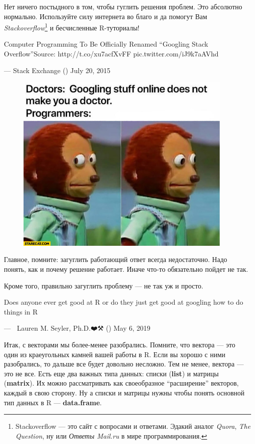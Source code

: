\documentclass[]{book}
\begin{document}
Нет ничего постыдного в том, чтобы гуглить решения проблем. Это
абсолютно нормально. Используйте силу интернета во благо и да помогут
Вам \emph{Stackoverflow}\footnote{Stackoverflow --- это сайт с вопросами
  и ответами. Эдакий аналог \emph{Quora}, \emph{The Question}, ну или
  \emph{Ответы Mail.ru} в мире программирования.} и бесчисленные
R-туториалы!

Computer Programming To Be Officially Renamed ``Googling Stack
Overflow''Source: http://t.co/xu7acfXvFF pic.twitter.com/iJ9k7aAVhd

--- Stack Exchange (\citet{StackExchange}) July 20, 2015

\begin{figure}
\centering
\includegraphics[width=4.16667in]{images/doctors-googling-stuff-online-does-not-make-you-a-doctor-programmers-confused.jpg}
\caption{}
\end{figure}

Главное, помните: загуглить работающий ответ всегда недостаточно. Надо
понять, как и почему решение работает. Иначе что-то обязательно пойдет
не так.

Кроме того, правильно загуглить проблему --- не так уж и просто.

Does anyone ever get good at R or do they just get good at googling how
to do things in R

--- 🔬🖤Lauren M. Seyler, Ph.D.❤️⚒ (\citet{mousquemere}) May 6, 2019

Итак, с векторами мы более-менее разобрались. Помните, что вектора ---
это один из краеугольных камней вашей работы в R. Если вы хорошо с ними
разобрались, то дальше все будет довольно несложно. Тем не менее,
вектора --- это не все. Есть еще два важных типа данных: списки
(\textbf{list}) и матрицы (\textbf{matrix}). Их можно рассматривать как
своеобразное ``расширение'' векторов, каждый в свою сторону. Ну а списки
и матрицы нужны чтобы понять основной тип данных в R ---
\textbf{data.frame}.
\end{document}
